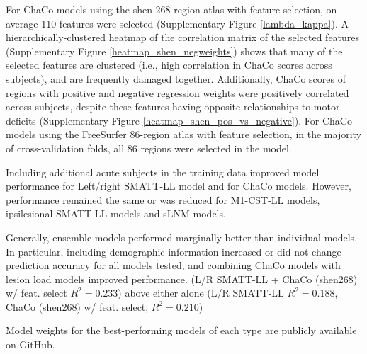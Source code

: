 \documentclass[phd,tocprelim]{cornell}
\begin{document}
For ChaCo models using the shen 268-region atlas with feature selection, on average 110 features were selected (Supplementary Figure \ref{lambda_kappa}). A hierarchically-clustered heatmap of the correlation matrix of the selected features (Supplementary Figure \ref{heatmap_shen_negweights}) shows that many of the selected features are clustered (i.e., high correlation in ChaCo scores across subjects), and are frequently damaged together. Additionally, ChaCo scores of regions with positive and negative regression weights were positively correlated across subjects, despite these features having opposite relationships to motor deficits (Supplementary Figure \ref{heatmap_shen_pos_vs_negative}). For ChaCo models using the FreeSurfer 86-region atlas with feature selection, in the majority of cross-validation folds, all 86 regions were selected in the model. 

Including additional acute subjects in the training data improved model performance for Left/right SMATT-LL model and for ChaCo models. However, performance remained the same or was reduced for M1-CST-LL models, ipsilesional SMATT-LL models and sLNM models.

Generally, ensemble models performed marginally better than individual models. In particular, including demographic information increased or did not change prediction accuracy for all models tested, and combining ChaCo models with lesion load models improved performance. (L/R SMATT-LL + ChaCo (shen268) w/ feat. select $R^2 = 0.233$) above either alone (L/R SMATT-LL $R^2=0.188$, ChaCo (shen268) w/ feat. select, $R^2=0.210$)

Model weights for the best-performing models of each type are publicly available on GitHub. 


\newpage 
\newpage
\end{document}
